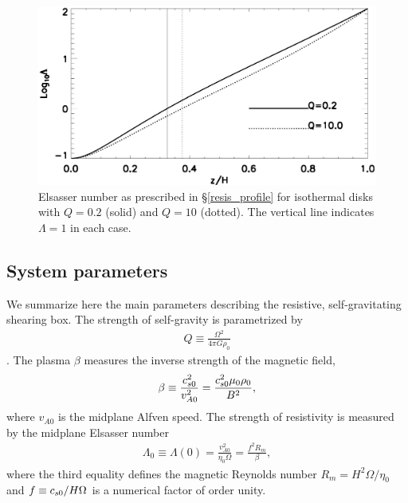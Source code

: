 \begin{figure}
  \includegraphics[width=\linewidth]{figures/elsasser_iso}
  \caption{Elsasser number as prescribed in \S\ref{resis_profile} for
    isothermal disks with $Q=0.2$ (solid) 
    and $Q=10$ (dotted). The vertical line
    indicates $\Lambda=1$ in each case. \label{eqm_resis}}
\end{figure}


\subsection{System parameters}
We summarize here the main parameters describing the resistive,
self-gravitating shearing box. The strength of self-gravity is
parametrized by 
\begin{align}
  Q \equiv \frac{\Omega^2}{4\pi G\rho_0}
\end{align}
\citep{mamat10}. The plasma $\beta$ measures the inverse strength of
the magnetic field,
\begin{align}
  \beta \equiv \frac{c_{s0}^2}{v_{A0}^2} =
  \frac{c_{s0}^2\mu_0\rho_0}{B^2},  
\end{align}
where $v_{A0}$ is the midplane Alfven speed. The strength of
resistivity is measured by the midplane Elsasser number 
\begin{align}
  \Lambda_0 \equiv\Lambda(0) =  \frac{v_{A0}^2}{\eta_0\Omega} = \frac{f^2 R_m}{\beta}, 
\end{align}
where the third equality defines the magnetic Reynolds number
$R_m=H^2\Omega/\eta_0$ and $f\equiv c_{s0}/H\Omega$ is a numerical
factor of order unity. 



